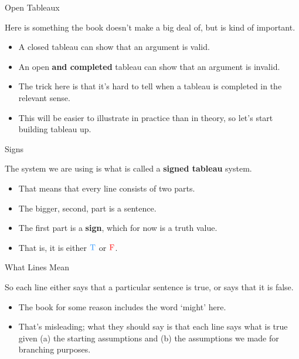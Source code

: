 \documentclass[
  ignorenonframetext,
]{beamer}
\providecommand{\tightlist}{%
  \setlength{\itemsep}{0pt}\setlength{\parskip}{0pt}}
\renewcommand{\,}{\text{, }}
\def\True{\textcolor{dodgerblue}{\text{T}}}
\def\False{\textcolor{red}{\text{F}}}
\begin{document}
\begin{frame}{Open Tableaux}
\protect\hypertarget{open-tableaux}{}

Here is something the book doesn't make a big deal of, but is kind of
important.

\begin{itemize}
\tightlist
\item
  A closed tableau can show that an argument is valid.
\item
  An open \textbf{and completed} tableau can show that an argument is
  invalid.\pause
\item
  The trick here is that it's hard to tell when a tableau is completed
  in the relevant sense.
\item
  This will be easier to illustrate in practice than in theory, so let's
  start building tableau up.
\end{itemize}

\end{frame}

\begin{frame}{Signs}
\protect\hypertarget{signs}{}

The system we are using is what is called a \textbf{signed tableau}
system.

\begin{itemize}
\tightlist
\item
  That means that every line consists of two parts.
\item
  The bigger, second, part is a sentence.
\item
  The first part is a \textbf{sign}, which for now is a truth value.
\item
  That is, it is either \(\True\) or \(\False\).
\end{itemize}

\end{frame}

\begin{frame}{What Lines Mean}
\protect\hypertarget{what-lines-mean}{}

So each line either says that a particular sentence is true, or says
that it is false.

\begin{itemize}
\tightlist
\item
  The book for some reason includes the word `might' here.
\item
  That's misleading; what they should say is that each line says what is
  true given (a) the starting assumptions and (b) the assumptions we
  made for branching purposes.
\end{itemize}

\end{frame}
\end{document}
